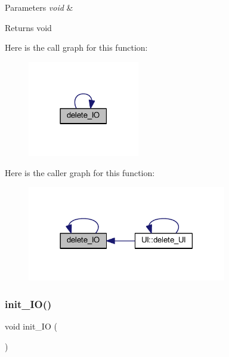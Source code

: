\begin{DoxyParams}{Parameters}
{\em void} & \\
\hline
\end{DoxyParams}
\begin{DoxyReturn}{Returns}
void 
\end{DoxyReturn}
Here is the call graph for this function\+:\nopagebreak
\begin{figure}[H]
\begin{center}
\leavevmode
\includegraphics[width=138pt]{namespace_i_o_a71df3822c66f8b597b92e7e906a9d61f_cgraph}
\end{center}
\end{figure}
Here is the caller graph for this function\+:\nopagebreak
\begin{figure}[H]
\begin{center}
\leavevmode
\includegraphics[width=246pt]{namespace_i_o_a71df3822c66f8b597b92e7e906a9d61f_icgraph}
\end{center}
\end{figure}
\mbox{\label{namespace_i_o_a83055f0dd9e551c9e898a69d48530663}} 
\subsubsection{\texorpdfstring{init\+\_\+\+I\+O()}{init\_IO()}}
{\footnotesize\ttfamily void init\+\_\+\+IO (\begin{DoxyParamCaption}{ }\end{DoxyParamCaption})}



